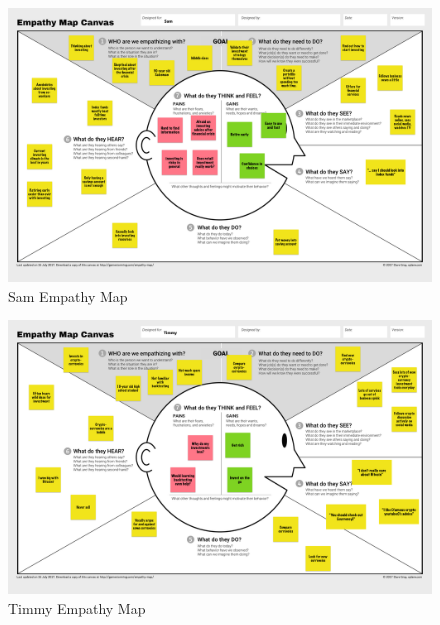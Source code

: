 \documentclass[main.tex]{subfiles}
\begin{document}
 \begin{figure}[H]
    \centering
    \includegraphics[angle=90,origin=c,width=1.1\textwidth,height=0.8\textheight]{08Appendices/085Background/085Pictures/Sam_emp.png}
    \caption{Sam Empathy Map}
 \end{figure}

 \begin{figure}[H]
    \centering
    \includegraphics[angle=90,origin=c,width=1.1\textwidth,height=0.8\textheight]{08Appendices/085Background/085Pictures/Timmy_emp.png}
    \caption{Timmy Empathy Map}
 \end{figure}
\end{document}
